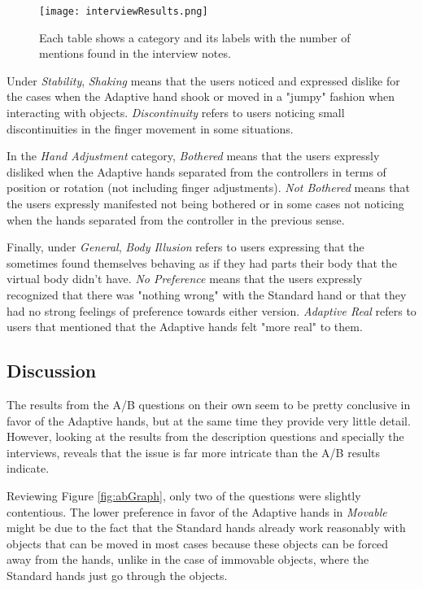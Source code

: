 \begin{figure}[H]
\centering
\texttt{[image: interviewResults.png]}
\caption{Each table shows a category and its labels with the number of mentions found in the interview notes.}
\label{fig:interviewResults}
\end{figure}

Under \textit{Stability}, \textit{Shaking} means that the users noticed and expressed dislike for the cases when the Adaptive hand shook or moved in a "jumpy" fashion when interacting with objects. \textit{Discontinuity} refers to users noticing small discontinuities in the finger movement in some situations.

In the \textit{Hand Adjustment} category, \textit{Bothered} means that the users expressly disliked when the Adaptive hands separated from the controllers in terms of position or rotation (not including finger adjustments). \textit{Not Bothered} means that the users expressly manifested not being bothered or in some cases not noticing when the hands separated from the controller in the previous sense.

Finally, under \textit{General}, \textit{Body Illusion} refers to users expressing that the sometimes found themselves behaving as if they had parts their body that the virtual body didn't have. \textit{No Preference} means that the users expressly recognized that there was "nothing wrong" with the Standard hand or that they had no strong feelings of preference towards either version. \textit{Adaptive Real} refers to users that mentioned that the Adaptive hands felt "more real" to them.

\subsection{Discussion}
\label{subsec:discussion}

The results from the A/B questions on their own seem to be pretty conclusive in favor of the Adaptive hands, but at the same time they provide very little detail. However, looking at the results from the description questions and specially the interviews, reveals that the issue is far more intricate than the A/B results indicate.

Reviewing Figure \ref{fig:abGraph}, only two of the questions were slightly contentious. The lower preference in favor of the Adaptive hands in \textit{Movable} might be due to the fact that the Standard hands already work reasonably with objects that can be moved in most cases because these objects can be forced away from the hands, unlike in the case of immovable objects, where the Standard hands just go through the objects.

